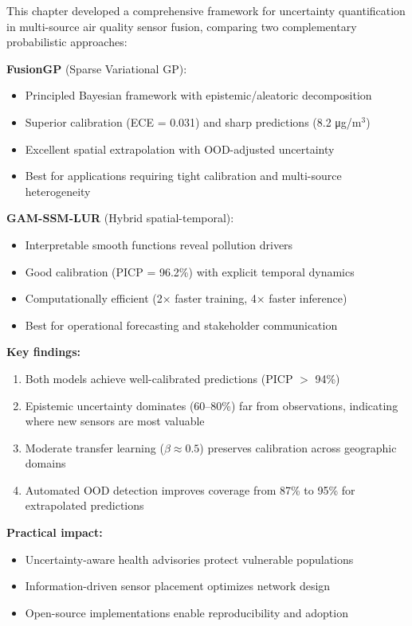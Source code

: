 \documentclass[11pt,letterpaper]{article}
\begin{document}
This chapter developed a comprehensive framework for uncertainty quantification in multi-source air quality sensor fusion, comparing two complementary probabilistic approaches:

\textbf{FusionGP} (Sparse Variational GP):
\begin{itemize}
    \item Principled Bayesian framework with epistemic/aleatoric decomposition
    \item Superior calibration (ECE = 0.031) and sharp predictions (8.2 μg/m$^3$)
    \item Excellent spatial extrapolation with OOD-adjusted uncertainty
    \item Best for applications requiring tight calibration and multi-source heterogeneity
\end{itemize}

\textbf{GAM-SSM-LUR} (Hybrid spatial-temporal):
\begin{itemize}
    \item Interpretable smooth functions reveal pollution drivers
    \item Good calibration (PICP = 96.2\%) with explicit temporal dynamics
    \item Computationally efficient (2× faster training, 4× faster inference)
    \item Best for operational forecasting and stakeholder communication
\end{itemize}

\textbf{Key findings:}
\begin{enumerate}
    \item Both models achieve well-calibrated predictions (PICP $>$ 94\%)
    \item Epistemic uncertainty dominates (60--80\%) far from observations, indicating where new sensors are most valuable
    \item Moderate transfer learning ($\beta \approx 0.5$) preserves calibration across geographic domains
    \item Automated OOD detection improves coverage from 87\% to 95\% for extrapolated predictions
\end{enumerate}

\textbf{Practical impact:}
\begin{itemize}
    \item Uncertainty-aware health advisories protect vulnerable populations
    \item Information-driven sensor placement optimizes network design
    \item Open-source implementations enable reproducibility and adoption
\end{itemize}
\end{document}
